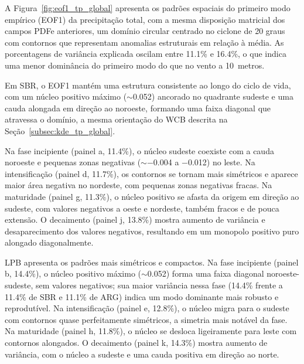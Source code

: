 A Figura~\ref{fig:eof1_tp_global} apresenta os padrões espaciais do primeiro modo empírico (EOF1) da precipitação total, com a mesma disposição matricial dos campos PDFe anteriores, um domínio circular centrado no ciclone de 20 graus com contornos que representam anomalias estruturais em relação à média. As porcentagens de variância explicada oscilam entre 11.1\% e 16.4\%, o que indica uma menor dominância do primeiro modo do que no vento a 10~metros.

Em SBR, o EOF1 mantém uma estrutura consistente ao longo do ciclo de vida, com um núcleo positivo máximo ($\sim$0.052) ancorado no quadrante sudeste e uma cauda alongada em direção ao noroeste, formando uma faixa diagonal que atravessa o domínio, a mesma orientação do WCB descrita na Seção~\ref{subsec:kde_tp_global}.

Na fase incipiente (painel a, 11.4\%), o núcleo sudeste coexiste com a cauda noroeste e pequenas zonas negativas ($\sim$$-$0.004 a $-$0.012) no leste. Na intensificação (painel d, 11.7\%), os contornos se tornam mais simétricos e aparece maior área negativa no nordeste, com pequenas zonas negativas fracas. Na maturidade (painel g, 11.3\%), o núcleo positivo se afasta da origem em direção ao sudeste, com valores negativos a oeste e nordeste, também fracos e de pouca extensão. O decaimento (painel j, 13.8\%) mostra aumento de variância e desaparecimento dos valores negativos, resultando em um monopolo positivo puro alongado diagonalmente.

LPB apresenta os padrões mais simétricos e compactos. Na fase incipiente (painel b, 14.4\%), o núcleo positivo máximo ($\sim$0.052) forma uma faixa diagonal noroeste-sudeste, sem valores negativos; sua maior variância nessa fase (14.4\% frente a 11.4\% de SBR e 11.1\% de ARG) indica um modo dominante mais robusto e reprodutível. Na intensificação (painel e, 12.8\%), o núcleo migra para o sudeste com contornos quase perfeitamente simétricos, a simetria mais notável da fase. Na maturidade (painel h, 11.8\%), o núcleo se desloca ligeiramente para leste com contornos alongados. O decaimento (painel k, 14.3\%) mostra aumento de variância, com o núcleo a sudeste e uma cauda positiva em direção ao norte.

